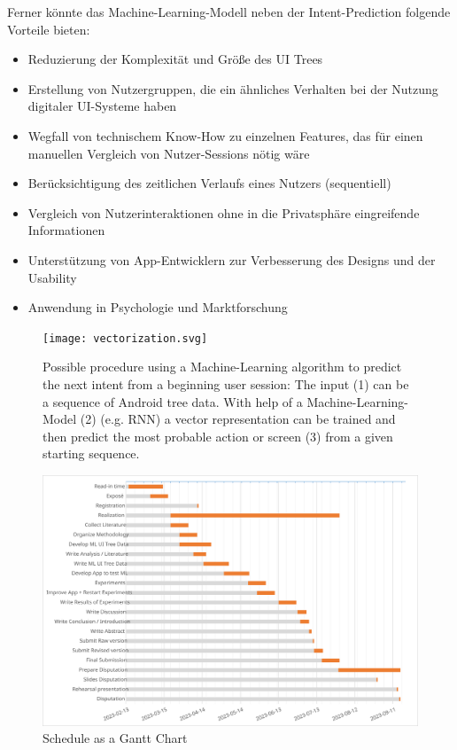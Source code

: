 Ferner könnte das Machine-Learning-Modell neben der Intent-Prediction folgende Vorteile bieten:
\begin{itemize}
  \item Reduzierung der Komplexität und Größe des UI Trees
  \item Erstellung von Nutzergruppen, die ein ähnliches Verhalten bei der Nutzung digitaler UI-Systeme haben
  \item Wegfall von technischem Know-How zu einzelnen Features, das für einen manuellen Vergleich von Nutzer-Sessions nötig wäre \cite{ghods2019activity2vec}
  \item Berücksichtigung des zeitlichen Verlaufs eines Nutzers (sequentiell)
  \item Vergleich von Nutzerinteraktionen ohne in die Privatsphäre eingreifende Informationen
  \item Unterstützung von App-Entwicklern zur Verbesserung des Designs und der Usability
  \item Anwendung in Psychologie und Marktforschung
\end{itemize}

\begin{figure}
  \centering
  \texttt{[image: vectorization.svg]}
  \caption{Possible procedure using a Machine-Learning algorithm to predict the next intent from a beginning user session: The input (1) can be a sequence of Android tree data. With help of a Machine-Learning-Model (2) (e.g. RNN) a vector representation can be trained and then predict the most probable action or screen (3) from a given starting sequence.}
  \label{fig:encode-decode}
\end{figure}

\begin{figure}
  \centering
  \includegraphics[width=\textwidth]{graphics/TimeTable-Gantt.svg}
  \caption{Schedule as a Gantt Chart}
  \label{fig:schedule}
\end{figure}